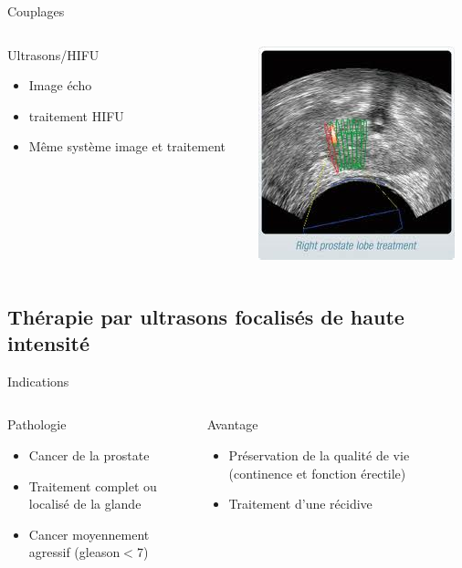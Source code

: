 \documentclass{beamer}
\begin{document}
\begin{frame}{Couplages}
 \centering
  \begin{columns}[T]
 \begin{column}{0.5\textwidth}
\begin{block}{Ultrasons/HIFU}
\begin{itemize}
  \item Image écho
  \item traitement HIFU
  \item Même système image et traitement
  \end{itemize}
\end{block}
 \end{column}
 \begin{column}{0.5\textwidth}
\includegraphics[height=0.5\textheight]{images/hifu_echo.jpg}
\end{column}
\end{columns}
\end{frame}

\subsection{Thérapie par ultrasons focalisés de haute intensité}
\begin{frame}{Indications}
  \centering
  \begin{columns}[T]
 \begin{column}{0.5\textwidth}
\begin{block}{Pathologie}
\begin{itemize}
  \item Cancer de la prostate
  \item Traitement complet ou localisé de la glande
  \item Cancer moyennement agressif (gleason$<$7)
  \end{itemize}
\end{block}
 \end{column}
 \begin{column}{0.5\textwidth}
\begin{block}{Avantage}
\begin{itemize}
  \item Préservation de la qualité de vie (continence et fonction érectile)
  \item Traitement d'une récidive
  \end{itemize}
\end{block}
\end{column}
\end{columns}
\end{frame}
\end{document}
